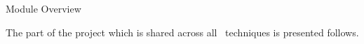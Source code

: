 \begin{section}{Module Overview}
    \par The part of the project which is shared across all~ techniques is presented follows.
    
    
    
    
\end{section}